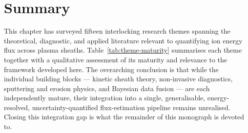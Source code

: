 \section{Summary}

This chapter has surveyed fifteen interlocking research themes spanning the theoretical, diagnostic, and applied literature relevant to quantifying ion energy flux across plasma sheaths. Table~\ref{tab:theme-maturity} summarises each theme together with a qualitative assessment of its maturity and relevance to the framework developed here. The overarching conclusion is that while the individual building blocks — kinetic sheath theory, non-invasive diagnostics, sputtering and erosion physics, and Bayesian data fusion — are each independently mature, their integration into a single, generalisable, energy-resolved, uncertainty-quantified flux-estimation pipeline remains unrealised. Closing this integration gap is what the remainder of this monograph is devoted to.

